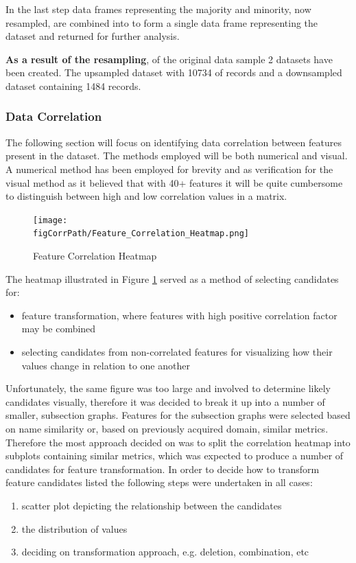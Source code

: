 In the last step data frames representing the majority and minority, now resampled, are combined into to form a single data frame representing the dataset and returned for further analysis.

\textbf{As a result of the resampling}, of the original data sample 2 datasets have been created. The upsampled dataset with 10734 of records and a downsampled dataset containing 1484 records.

\subsubsection{Data Correlation}\label{sec:impl-data-analysis:corr:generic-approach}
The following section will focus on identifying data correlation between features present in the dataset. The methods employed will be both numerical and visual. A numerical method has been employed for brevity and as verification for the visual method as it believed that with 40+ features it will be quite cumbersome to distinguish between high and low correlation values in a matrix.

\begin{figure}
    \texttt{[image: \\figCorrPath/Feature\_Correlation\_Heatmap.png]}
    \caption{Feature Correlation Heatmap}
    \label{fig:correlation-all-features}
\end{figure}


The heatmap illustrated in Figure \ref{fig:correlation-all-features} served as a method of selecting candidates for:
\begin{itemize}
    \item feature transformation, where features with high positive correlation factor may be combined 
    \item selecting candidates from non-correlated features for visualizing how their values change in relation to one another
\end{itemize}

Unfortunately, the same figure was too large and involved to determine likely candidates visually, therefore it was decided to break it up into a number of smaller, subsection graphs. Features for the subsection graphs were selected based on name similarity or, based on previously acquired domain, similar metrics.
Therefore the most approach decided on was to split the correlation heatmap into subplots containing similar metrics, which was expected to produce a number of candidates for feature transformation. In order to decide how to transform feature candidates listed the following steps were undertaken in all cases:
\begin{enumerate}
    \item scatter plot depicting the relationship between the candidates
    \item the distribution of values 
    \item deciding on transformation approach, e.g. deletion, combination, etc
\end{enumerate}


